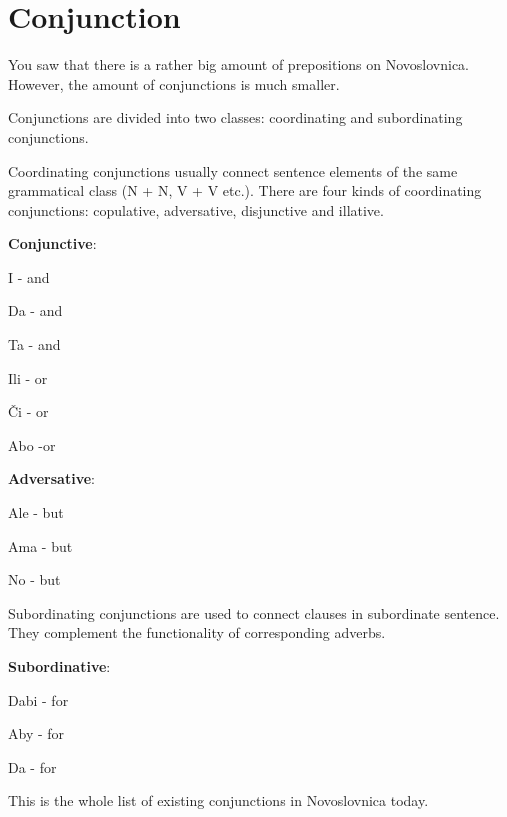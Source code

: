 \section{Conjunction}

You saw that there is a rather big amount of prepositions on Novoslovnica. However, the amount of conjunctions is much smaller. 

Conjunctions are divided into two classes: coordinating and subordinating conjunctions.

Coordinating conjunctions usually connect sentence elements of the same grammatical class (N + N, V + V etc.). There are four kinds of coordinating conjunctions: copulative, adversative, disjunctive and illative.

\textbf{Conjunctive}:

I - and

Da - and

Ta - and

Ili - or

Či - or

Abo -or

\textbf{Adversative}:

Ale - but

Ama - but

No - but

Subordinating conjunctions are used to connect clauses in subordinate sentence. They complement the functionality of corresponding adverbs.

\textbf{Subordinative}:

Dabi - for

Aby - for

Da - for

This is the whole list of existing conjunctions in Novoslovnica today.
